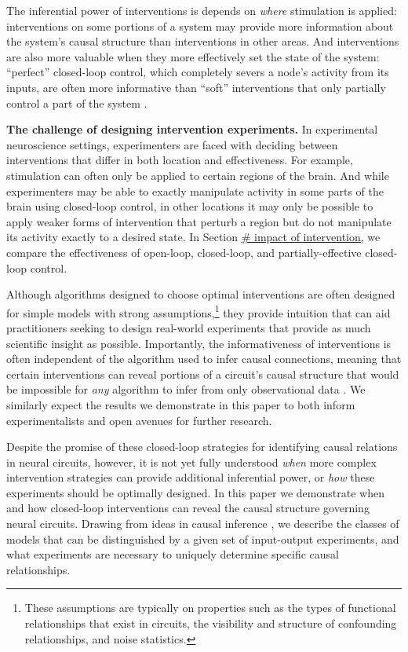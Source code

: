 \documentclass{article}
\begin{document}
The inferential power of interventions is depends on \emph{where}
stimulation is applied: interventions on some portions of a system may provide more information about the system's causal structure than interventions in other areas. And interventions are also more valuable when they more effectively set the state of the system: ``perfect''
closed-loop control, which completely severs a node's activity from its inputs, are often more informative than ``soft'' interventions that only partially control a part of the system
\autocite{eberhardt2007interventions}.

\textbf{The challenge of designing intervention experiments.} In experimental neuroscience settings, experimenters are faced with deciding between interventions that differ in both location and effectiveness. For example, stimulation can often only be applied to certain regions of the brain. And while experimenters may be able to exactly manipulate activity in some parts of the brain using closed-loop control, in other locations it may only be possible to apply weaker forms of intervention that perturb a region but do not manipulate its activity exactly to a desired state. In Section
\href{REF-SECTION-HERE}{\# impact of intervention}, we compare the effectiveness of open-loop, closed-loop, and partially-effective closed-loop control.

Although algorithms designed to choose optimal interventions are often designed for simple models with strong assumptions,\footnote{These
  assumptions are typically on properties such as the types of
  functional relationships that exist in circuits, the visibility and
  structure of confounding relationships, and noise statistics.} they provide intuition that can aid practitioners seeking to design real-world experiments that provide as much scientific insight as possible. Importantly, the informativeness of interventions is often independent of the algorithm used to infer causal connections, meaning that certain interventions can reveal portions of a circuit's causal structure that would be impossible for \emph{any} algorithm to infer from only observational data \autocite{das2020systematic}. We similarly expect the results we demonstrate in this paper to both inform experimentalists and open avenues for further research.

Despite the promise of these closed-loop strategies for identifying causal relations in neural circuits, however, it is not yet fully understood \emph{when} more complex intervention strategies can provide additional inferential power, or \emph{how} these experiments should be optimally designed. In this paper we demonstrate when and how closed-loop interventions can reveal the causal structure governing neural circuits. Drawing from ideas in causal inference
\autocite{pearl2009causality,maathuis2016review,chis2011structural}, we describe the classes of models that can be distinguished by a given set of input-output experiments, and what experiments are necessary to uniquely determine specific causal relationships.
\end{document}
